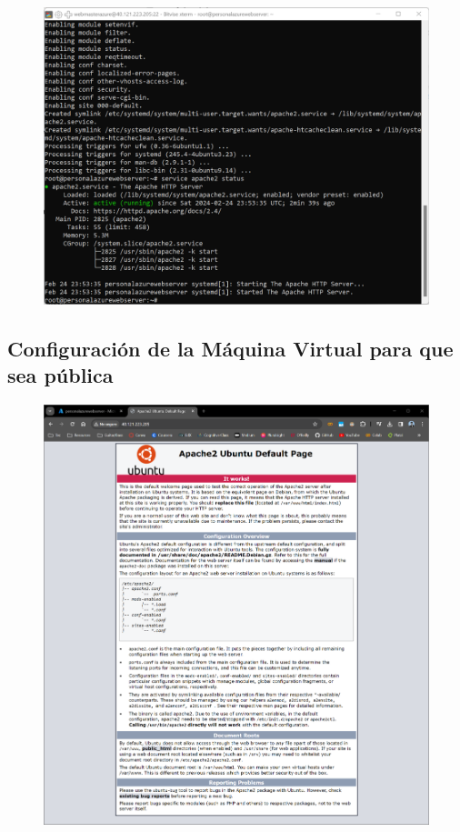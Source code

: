 \documentclass[12pt,a4paper]{article}
\begin{document}
\begin{figure}[H]
    \centering
    \includegraphics[width=1\linewidth]{M4_Servicios_Cómputo_en_la_Nube/Tarea_5_Creación_Máquinas_Virtuales_en_Nube/reporte/figuras/1_2_2_PHP_servidor_Web.png}
    \label{fig:Azure_5}
\end{figure}

\subsection{Configuración de la Máquina Virtual para que sea pública}

\begin{figure}[H]
    \centering
    \includegraphics[width=1\linewidth]{M4_Servicios_Cómputo_en_la_Nube/Tarea_5_Creación_Máquinas_Virtuales_en_Nube/reporte/figuras/1_3_1_Configuración_Pública.png}
    \label{fig:Azure_6}
\end{figure}
\end{document}
